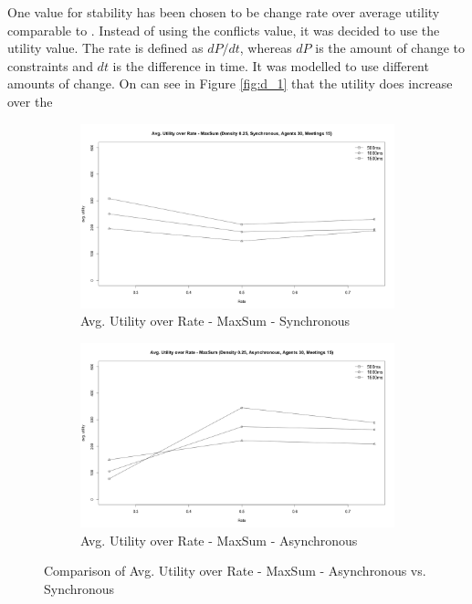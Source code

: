 One value for stability has been chosen to be change rate over average utility comparable to \cite{Maillera}. Instead of using the conflicts value, it was decided to use the utility value. The rate is defined as \(dP/dt\), whereas \(dP\) is the amount of change to constraints and \(dt\) is the difference in time. It was modelled to use different amounts of change. On can see in Figure \ref{fig:d_1} that the utility does increase over the 


\begin{figure}[H]
\centering
\begin{subfigure}{0.5\textwidth}
  \centering
  \includegraphics[width=1\linewidth]{graphics/experiments/dynamic/d_2.png}
  \caption{Avg. Utility over Rate - MaxSum - Synchronous}
  \label{fig:d_2}
\end{subfigure}%
\begin{subfigure}{0.5\textwidth}
  \centering
  \includegraphics[width=1\linewidth]{graphics/experiments/dynamic/d_3.png}
  \caption{Avg. Utility over Rate - MaxSum - Asynchronous}
  \label{fig:d_3}
\end{subfigure}
\caption{Comparison of Avg. Utility over Rate - MaxSum - Asynchronous vs. Synchronous}
\label{fig:test}
\end{figure}


